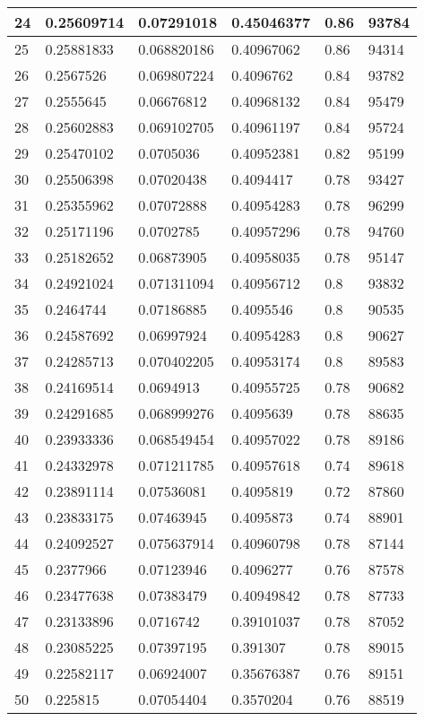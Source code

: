 \begin{longtable}{|l|l|l|l|l|l|}
24 & 0.25609714 & 0.07291018 & 0.45046377 & 0.86 & 93784 \\ \hline 
25 & 0.25881833 & 0.068820186 & 0.40967062 & 0.86 & 94314 \\ \hline 
26 & 0.2567526 & 0.069807224 & 0.4096762 & 0.84 & 93782 \\ \hline 
27 & 0.2555645 & 0.06676812 & 0.40968132 & 0.84 & 95479 \\ \hline 
28 & 0.25602883 & 0.069102705 & 0.40961197 & 0.84 & 95724 \\ \hline 
29 & 0.25470102 & 0.0705036 & 0.40952381 & 0.82 & 95199 \\ \hline 
30 & 0.25506398 & 0.07020438 & 0.4094417 & 0.78 & 93427 \\ \hline 
31 & 0.25355962 & 0.07072888 & 0.40954283 & 0.78 & 96299 \\ \hline 
32 & 0.25171196 & 0.0702785 & 0.40957296 & 0.78 & 94760 \\ \hline 
33 & 0.25182652 & 0.06873905 & 0.40958035 & 0.78 & 95147 \\ \hline 
34 & 0.24921024 & 0.071311094 & 0.40956712 & 0.8 & 93832 \\ \hline 
35 & 0.2464744 & 0.07186885 & 0.4095546 & 0.8 & 90535 \\ \hline 
36 & 0.24587692 & 0.06997924 & 0.40954283 & 0.8 & 90627 \\ \hline 
37 & 0.24285713 & 0.070402205 & 0.40953174 & 0.8 & 89583 \\ \hline 
38 & 0.24169514 & 0.0694913 & 0.40955725 & 0.78 & 90682 \\ \hline 
39 & 0.24291685 & 0.068999276 & 0.4095639 & 0.78 & 88635 \\ \hline 
40 & 0.23933336 & 0.068549454 & 0.40957022 & 0.78 & 89186 \\ \hline 
41 & 0.24332978 & 0.071211785 & 0.40957618 & 0.74 & 89618 \\ \hline 
42 & 0.23891114 & 0.07536081 & 0.4095819 & 0.72 & 87860 \\ \hline 
43 & 0.23833175 & 0.07463945 & 0.4095873 & 0.74 & 88901 \\ \hline 
44 & 0.24092527 & 0.075637914 & 0.40960798 & 0.78 & 87144 \\ \hline 
45 & 0.2377966 & 0.07123946 & 0.4096277 & 0.76 & 87578 \\ \hline 
46 & 0.23477638 & 0.07383479 & 0.40949842 & 0.78 & 87733 \\ \hline 
47 & 0.23133896 & 0.0716742 & 0.39101037 & 0.78 & 87052 \\ \hline 
48 & 0.23085225 & 0.07397195 & 0.391307 & 0.78 & 89015 \\ \hline 
49 & 0.22582117 & 0.06924007 & 0.35676387 & 0.76 & 89151 \\ \hline 
50 & 0.225815 & 0.07054404 & 0.3570204 & 0.76 & 88519 \\ \hline 
\end{longtable}